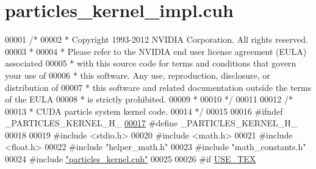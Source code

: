 \hypertarget{particles__kernel__impl_8cuh_source}{\section{particles\-\_\-kernel\-\_\-impl.\-cuh}
}

\begin{DoxyCode}
00001 \textcolor{comment}{/*}
00002 \textcolor{comment}{ * Copyright 1993-2012 NVIDIA Corporation.  All rights reserved.}
00003 \textcolor{comment}{ *}
00004 \textcolor{comment}{ * Please refer to the NVIDIA end user license agreement (EULA) associated}
00005 \textcolor{comment}{ * with this source code for terms and conditions that govern your use of}
00006 \textcolor{comment}{ * this software. Any use, reproduction, disclosure, or distribution of}
00007 \textcolor{comment}{ * this software and related documentation outside the terms of the EULA}
00008 \textcolor{comment}{ * is strictly prohibited.}
00009 \textcolor{comment}{ *}
00010 \textcolor{comment}{ */}
00011 
00012 \textcolor{comment}{/*}
00013 \textcolor{comment}{ * CUDA particle system kernel code.}
00014 \textcolor{comment}{ */}
00015 
00016 \textcolor{preprocessor}{#}\textcolor{preprocessor}{ifndef} \textcolor{preprocessor}{\_PARTICLES\_KERNEL\_H\_}
\hypertarget{particles__kernel__impl_8cuh_source_l00017}{}\hyperlink{particles__kernel__impl_8cuh_a5de512cb982bf8e9102c9e80ae68a7f2}{00017} \textcolor{preprocessor}{#}\textcolor{preprocessor}{define} \textcolor{preprocessor}{\_PARTICLES\_KERNEL\_H\_}
00018 
00019 \textcolor{preprocessor}{#}\textcolor{preprocessor}{include} \textcolor{preprocessor}{<}\textcolor{preprocessor}{stdio}\textcolor{preprocessor}{.}\textcolor{preprocessor}{h}\textcolor{preprocessor}{>}
00020 \textcolor{preprocessor}{#}\textcolor{preprocessor}{include} \textcolor{preprocessor}{<}\textcolor{preprocessor}{math}\textcolor{preprocessor}{.}\textcolor{preprocessor}{h}\textcolor{preprocessor}{>}
00021 \textcolor{preprocessor}{#}\textcolor{preprocessor}{include} \textcolor{preprocessor}{<}\textcolor{keywordtype}{float}\textcolor{preprocessor}{.}\textcolor{preprocessor}{h}\textcolor{preprocessor}{>}
00022 \textcolor{preprocessor}{#}\textcolor{preprocessor}{include} \textcolor{preprocessor}{"helper\_math.h"}
00023 \textcolor{preprocessor}{#}\textcolor{preprocessor}{include} \textcolor{preprocessor}{"math\_constants.h"}
00024 \textcolor{preprocessor}{#}\textcolor{preprocessor}{include} \hyperlink{particles__kernel_8cuh}{"particles\_kernel.cuh"}
00025 
00026 \textcolor{preprocessor}{#}\textcolor{preprocessor}{if} \hyperlink{particles__kernel_8cuh_a0ab211ca35e2616c721fcf2dd4f99c83}{USE\_TEX}

\end{DoxyCode}
